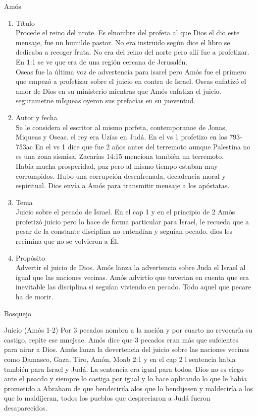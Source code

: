 \documentclass[12pt]{article}
\begin{document}
\begin{section}{Amós}
	\begin{enumerate}
		\item Título\\
			Procede el reino del nrote. Es elnombre del profeta al que Dios el dio este mensaje, fue un humilde pastor. No era instruido según dice el libro se dedicaba a recoger fruta. No era del reino del norte pero allí fue a profetizar. En 1:1 se ve que era de una región cercana de Jerusalén.\\
			Oseas fue la última voz de advertencia para isarel pero Amós fue el primero que empezó a profetizar sobre el juicio en contra de Israel. Oseas enfatizó el amor de Dios en su ministerio mientras que Amós enfatiza el juicio. segurametne mIqueas oyeron sus prefacías en su jueventud.
		\item Autor y fecha\\
			Se le considera el escritor al mismo porfeta, contemporanoe de Jonas, Miqueas y Oseas. el rey era Uzías en Judá. En el vs 1 profetizo en los 793-753ac En el vs 1 dice que fue 2 años antes del terremoto aunque Palestina no es una zona sísmisa. Zacarías 14:15 menciona también un terremoto.\\
			Había mucha prosperidad, paz pero al mismo tiempo estaban muy corrompidos. Hubo una corrupción desenfrenada, decadencia moral y espiritual. Dios envía a Amós para transmitir mensaje a los apóstatas.
		\item Tema\\
			Juicio sobre el pecado de Israel. En el cap 1 y en el principio de 2 Amós profetizó juicio pero lo hace de forma particular para Israel, le recueda que a pesar de la constante disciplina no entendían y seguían pecado. dios les recimina que no se volvieron a Él.
		\item Propósito\\
			Advertir el juicio de Dios. Amós lanza la advertencia sobre Juda el Israel al igual que las naciones vecinas. Amós advirtío que tuverian en cuenta que era inevitable las disciplina si seguían viviendo en pecado. Todo aquel que pecare ha de morir.
	\end{enumerate}
	\begin{subsection}{Bosquejo}
		\begin{subsubsection}{Juicio (Amós 1-2)}
			Por 3 pecados nombra a la nación y por cuarto no revocaría su castigo, repite ese mnejsae. Amós dice que 3 pecados eran más que sufcientes para airar a Dios. Amós lanza la devertencia del juicio sobre las naciones vecinas como Damasco, Gaza, Tiro, Amón, Moab 2:1 y en el cap 2 l sentencia habla también para Israel y Judá. La sentencia era igual para todos. Dios no es ciego ante el peacdo y siempre lo castiga por igual y lo hace aplicando lo que le había prometido a Abraham de que bendeciriía alos que lo bendijesen y maldeciría a los que lo maldijeran, todos los pueblos que despreciaron a Judá fueron desaparecidos.

\end{subsubsection}
\end{subsection}
\end{section}
\end{document}
